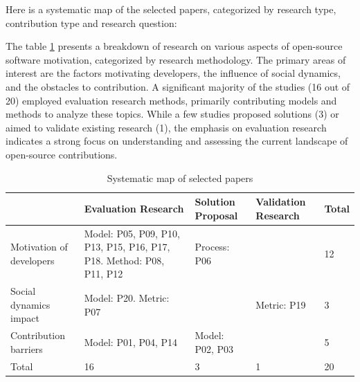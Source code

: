 Here is a systematic map of the selected papers, categorized by research type, contribution type and research question:

The table \ref{tab:systematicMap} presents a breakdown of research on various aspects of open-source software motivation, categorized by research methodology. The primary areas of interest are the factors motivating developers, the influence of social dynamics, and the obstacles to contribution. A significant majority of the studies (16 out of 20) employed evaluation research methods, primarily contributing models and methods to analyze these topics. While a few studies proposed solutions (3) or aimed to validate existing research (1), the emphasis on evaluation research indicates a strong focus on understanding and assessing the current landscape of open-source contributions.

\begin{table}[ht]
    \centering
    \begin{tabular}{| m{7em} | m{5.5em}| m{5.5em} | m{5.5em} | m{3em} |}
        \hline
                                 & Evaluation Research                                                  & Solution Proposal & Validation Research & Total \\
        \hline
        Motivation of developers & Model: P05, P09, P10, P13, P15, P16, P17, P18. Method: P08, P11, P12 & Process: P06      &                     & 12    \\ \hline
        Social dynamics impact   & Model: P20. Metric: P07                                              &                   & Metric: P19         & 3     \\ \hline
        Contribution barriers    & Model: P01, P04, P14                                                 & Model: P02, P03   &                     & 5     \\ \hline
        Total                    & 16                                                                   & 3                 & 1                   & 20    \\ \hline
    \end{tabular}
    \caption{Systematic map of selected papers}
    \label{tab:systematicMap}
\end{table}





